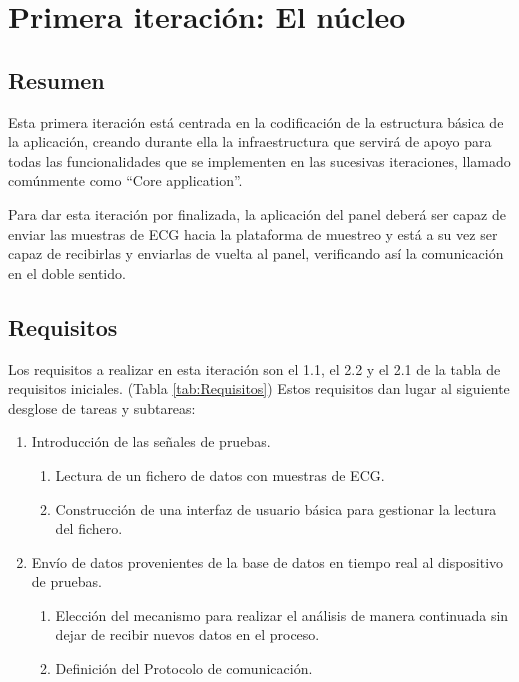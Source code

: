 
\section{Primera iteración: El núcleo}
    \subsection{Resumen}

        Esta primera iteración está centrada en la codificación de la estructura básica de la aplicación, creando durante ella la infraestructura que servirá de apoyo para todas las funcionalidades que se implementen en las sucesivas iteraciones, llamado comúnmente como ``Core application''. 

        Para dar esta iteración por finalizada, la aplicación del panel deberá ser capaz de enviar las muestras de ECG hacia la plataforma de muestreo y está a su vez ser capaz de recibirlas y enviarlas de vuelta al panel, verificando así la comunicación en el doble sentido.

    \subsection{Requisitos}

        Los requisitos a realizar en esta iteración son el 1.1, el 2.2 y el 2.1 de la tabla de requisitos iniciales. (Tabla \ref{tab:Requisitos}) Estos requisitos dan lugar al siguiente desglose de tareas y subtareas:

        \begin{enumerate}
                \item Introducción de las señales de pruebas.
                \begin{enumerate}
                        \item Lectura de un fichero de datos con muestras de ECG.
                        \item Construcción de una interfaz de usuario básica para gestionar la lectura del fichero.
                \end{enumerate}
                \item Envío de datos provenientes de la base de datos en tiempo real al dispositivo de pruebas.
                \begin{enumerate}
                        \item Elección del mecanismo para realizar el análisis de manera continuada sin dejar de recibir nuevos datos en el proceso.
                        \item Definición del Protocolo de comunicación.
                \end{enumerate}
        \end{enumerate}

